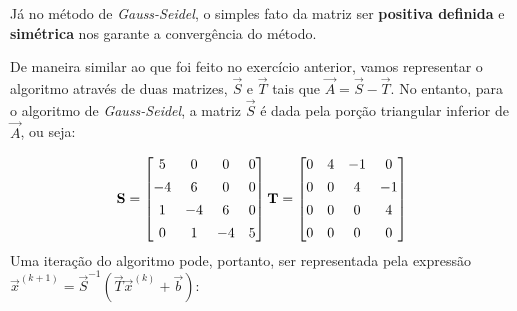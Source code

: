 \documentclass{homework}
\begin{document}
		Já no método de \textit{Gauss-Seidel}, o simples fato da matriz ser \textbf{positiva definida} e \textbf{simétrica} nos garante a convergência do método.\par
		
		De maneira similar ao que foi feito no exercício anterior, vamos representar o algoritmo através de duas matrizes, $\vec{S}$ e $\vec{T}$ tais que $\vec{A} = \vec{S} - \vec{T}$. No entanto, para o algoritmo de \textit{Gauss-Seidel}, a matriz $\vec{S}$ é dada pela porção triangular inferior de $\vec{A}$, ou seja:\par
			$$\vec{S} = \left[
			\begin{array}{@{}cccc@{}}
			5 & 0 & 0 & 0 \\[1ex]
			-4 & 6 & 0 & 0 \\[1ex]
			1 & -4 & 6 & 0 \\[1ex]
			0 & 1 & -4 & 5
			\end{array}\right]
			\vec{T} = \left[
			\begin{array}{@{}cccc@{}}
			0 & 4 & -1 & 0 \\[1ex]
			0 & 0 & 4 & -1 \\[1ex]
			0 & 0 & 0 & 4 \\[1ex]
			0 & 0 & 0 & 0
			\end{array}
			\right]$$
		Uma iteração do algoritmo pode, portanto, ser representada pela expressão $\vec{x}^{(k+1)} = \vec{S}^{-1}\left(\vec{T}\vec{x}^{(k)} + \vec{b}\right)$:
		
\end{document}
